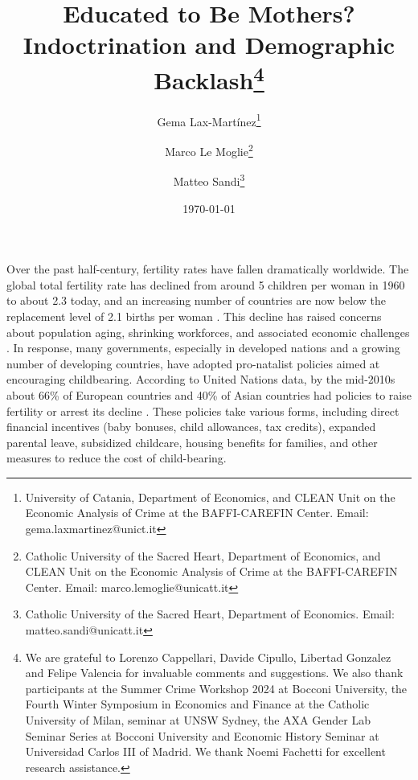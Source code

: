 \documentclass[a4paper,oneside,final,onecolumn,11pt,english]{article}
\begin{document}

\title{ \vspace{-2cm} \huge Educated to Be Mothers? \\ Indoctrination and Demographic Backlash\thanks{\small  We are grateful to Lorenzo Cappellari, Davide Cipullo, Libertad Gonzalez and Felipe Valencia for invaluable comments and suggestions. We also thank participants at the Summer Crime Workshop 2024 at Bocconi University, the Fourth Winter Symposium in Economics and Finance at the Catholic University of Milan, seminar at UNSW Sydney, the AXA Gender Lab Seminar Series at Bocconi University and Economic History Seminar at Universidad Carlos III of Madrid. We thank Noemi Fachetti for excellent research assistance. } \vspace{-0.2cm}}
 
\date{\today }

\author{
Gema Lax-Mart\'{i}nez\thanks{University of Catania, Department of Economics, and CLEAN Unit on the Economic Analysis of Crime at the BAFFI-CAREFIN Center. Email: gema.laxmartinez@unict.it} \\ 
        \and 
        Marco Le Moglie\thanks{Catholic University of the Sacred Heart, Department of Economics, and CLEAN Unit on the Economic Analysis of Crime at the BAFFI-CAREFIN Center. Email: marco.lemoglie@unicatt.it} \\ 
        \and 
        Matteo Sandi\thanks{Catholic University of the Sacred Heart, Department of Economics. Email: matteo.sandi@unicatt.it}\\ 
        }
        
        
\maketitle





\hspace{0.5cm}Over the past half-century, fertility rates have fallen dramatically worldwide. The global total fertility rate has declined from around 5 children per woman in 1960 to about 2.3 today, and an increasing number of countries are now below the replacement level of 2.1 births per woman \citep{rindfuss2010child, hart2024causal}. This decline has raised concerns about population aging, shrinking workforces, and associated economic challenges \citep{hart2024causal}. In response, many governments, especially in developed nations and a growing number of developing countries, have adopted pro-natalist policies aimed at encouraging childbearing. According to United Nations data, by the mid-2010s about 66\% of European countries and 40\% of Asian countries had policies to raise fertility or arrest its decline \citep{hart2024causal}. These policies take various forms, including direct financial incentives (baby bonuses, child allowances, tax credits), expanded parental leave, subsidized childcare, housing benefits for families, and other measures to reduce the cost of child-bearing.
\end{document}
